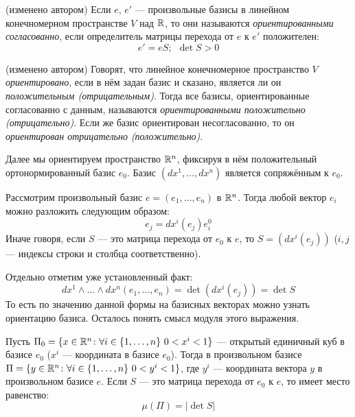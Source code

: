 \begin{definition} (изменено автором)
	Если $e$, $e'$ --- произвольные базисы в линейном конечномерном пространстве $V$ над $\mathbb{R}$, то они называются \textit{ориентированными согласованно}, если определитель матрицы перехода от $e$ к $e'$ положителен:
	\[
		e' = eS;\ \ \det S > 0
	\]
\end{definition}

\begin{definition} (изменено автором)
	Говорят, что линейное конечномерное пространство $V$ \textit{ориентировано}, если в нём задан базис и сказано, является ли он \textit{положительным (отрицательным)}. Тогда все базисы, ориентированные согласованно с данным, называются \textit{ориентированными положительно (отрицательно)}. Если же базис ориентирован несогласованно, то он \textit{ориентирован отрицательно (положительно)}.
\end{definition}

\begin{note}
	Далее мы ориентируем пространство $\mathbb{R}^n$, фиксируя в нём положительный ортонормированный базис $e_0$. Базис $(dx^1, \ldots, dx^n)$ является сопряжённым к $e_0$.
\end{note}

\begin{note}
	Рассмотрим произвольный базис $e = (e_1, \ldots, e_n)$ в $\mathbb{R}^n$. Тогда любой вектор $e_i$ можно разложить следующим образом:
	\[
		e_j = dx^i(e_j)e_i^0
	\]
	Иначе говоря, если $S$ --- это матрица перехода от $e_0$ к $e$, то $S = (dx^i(e_j))$ ($i, j$ --- индексы строки и столбца соответственно).
	
	Отдельно отметим уже установленный факт:
	\[
		dx^1 \wedge \ldots \wedge dx^n (e_1, \ldots, e_n) = \det(dx^i(e_j)) = \det S
	\]
	То есть по значению данной формы на базисных векторах можно узнать ориентацию базиса. Осталось понять смысл модуля этого выражения.
\end{note}

\begin{proposition}
	Пусть $\Pi_0 = \{x \in \mathbb{R}^n \colon \forall i \in \{1, \ldots, n\}\ 0 < x^i < 1\}$ --- открытый единичный куб в базисе $e_0$ ($x^i$ --- координата в базисе $e_0$). Тогда в произвольном базисе $\Pi = \{y \in \mathbb{R}^n \colon \forall i \in \{1, \ldots, n\}\ 0 < y^i < 1\}$, где $y^i$ --- координата вектора $y$ в произвольном базисе $e$. Если $S$ --- это матрица перехода от $e_0$ к $e$, то имеет место равенство:
	\[
		\mu(\Pi) = |\det S|
	\]
\end{proposition}


